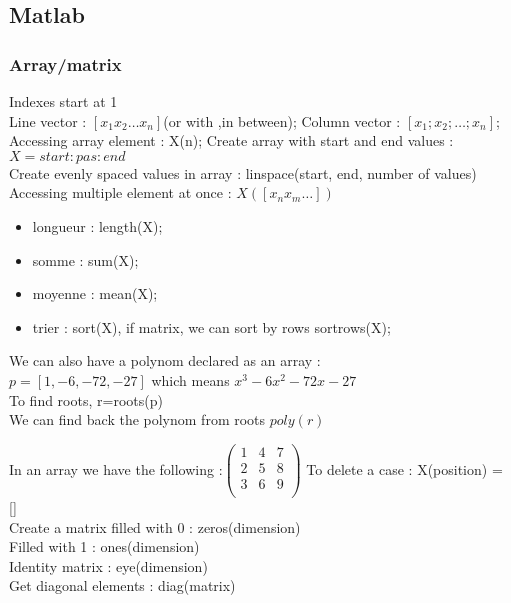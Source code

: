 \documentclass[../main.tex]{subfiles}
\begin{document}
\localtableofcontents
\subsection{Matlab}
\subsubsection{Array/matrix}
Indexes start at 1\\
Line vector : $[x_1 x_2 \dots x_n]$(or with ,in between);
Column vector : $[x_1; x_2; \dots ; x_n]$;
Accessing array element : X(n);
Create array with start and end values : $X=start:pas:end$\\
Create evenly spaced values in array : linspace(start, end, number of values)\\
Accessing multiple element at once : $X([x_n x_m \dots])$\\

\begin{minipage}{.5\textwidth}
\begin{itemize}
    \item longueur : length(X);\\
    \item somme : sum(X);\\
    \item moyenne : mean(X);\\
    \item trier : sort(X), if matrix, we can sort by rows sortrows(X);\\
\end{itemize}
\end{minipage}
\vline
\begin{minipage}{.5\textwidth}
    We can also have a polynom declared as an array :\\
    $p=[1, -6, -72, -27]$ which means $x^3 - 6x^2 -72x - 27$\\
    To find roots, r=roots(p)\\
    We can find back the polynom from roots $poly(r)$\\
\end{minipage}
In an array we have the following :$\begin{pmatrix}
1 & 4 & 7\\
2 & 5 & 8\\
3 & 6 & 9\\
\end{pmatrix}$
To delete a case : X(position) = []\\

Create a matrix filled with 0 : zeros(dimension)\\
Filled with 1 : ones(dimension)\\
Identity matrix : eye(dimension)\\
Get diagonal elements : diag(matrix)\\
\end{document}

